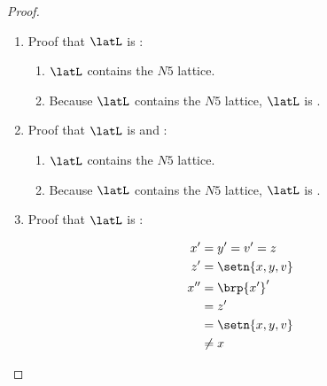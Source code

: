 \begin{proof}
\begin{enumerate}
  \item Proof that $\latL$ is : \label{item:wavprop_nondistrib}
    \begin{enumerate}
      \item $\latL$ contains the $N5$ lattice.
      \item Because $\latL$ contains the $N5$ lattice, $\latL$ is .
    \end{enumerate}

  \item Proof that $\latL$ is  and : 
    \begin{enumerate}
      \item $\latL$ contains the $N5$ lattice.
      \item Because $\latL$ contains the $N5$ lattice, $\latL$ is .
    \end{enumerate}

  \item Proof that $\latL$ is :
    \begin{minipage}{50mm}
      \begin{align*}
          x' &= y' = v' = z
        \\z' &= \setn{x,y,v}
        \\x''&= \brp{x'}'
           \\&= z'
           \\&= \setn{x,y,v}
           \\&\ne  x
      \end{align*}
    \end{minipage}\qquad{}%


\end{enumerate}
\end{proof}
